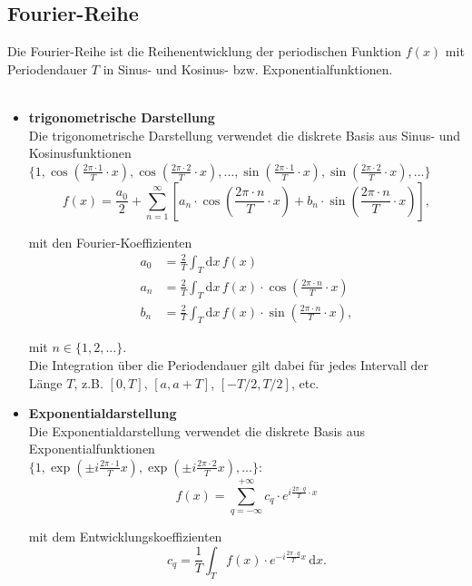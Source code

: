\documentclass{article}
\newcommand{\diff}{\mathrm{d}}
\newcommand{\lr}[1]{\left(#1\right)}
\newcommand{\lreck}[1]{\left[#1\right]}
\begin{document}
\subsection{Fourier-Reihe}
Die Fourier-Reihe ist die Reihenentwicklung der periodischen Funktion $f(x)$ mit Periodendauer $T$ in Sinus- und Kosinus- bzw. Exponentialfunktionen.\\
\\
	\begin{itemize}
		\item \textbf{trigonometrische Darstellung}\\
		Die trigonometrische Darstellung verwendet die diskrete Basis aus Sinus- und Kosinusfunktionen
		$\{1, \cos \lr{ \frac{2\pi \cdot 1}{T} \cdot x }, \cos \lr{ \frac{2\pi \cdot 2}{T} \cdot x}, ..., \sin \lr{ \frac{2\pi \cdot 1}{T} \cdot x }, \sin \lr{ \frac{2\pi \cdot 2}{T} \cdot x }, ... \}$
			\begin{equation}
				f(x) = \frac{a_0}{2} + \sum_{n=1}^\infty \lreck{ a_n \cdot \cos \lr{ \frac{2\pi \cdot n}{T} \cdot x } + b_n \cdot \sin \lr{ \frac{2\pi \cdot n}{T} \cdot x } },
			\end{equation}

		mit den Fourier-Koeffizienten
			\begin{align}
				a_0 &= \frac{2}{T} \int_T \diff x \, f(x) \\
				a_n &= \frac{2}{T} \int_T \diff x \, f(x) \cdot \cos \lr{ \frac{2\pi \cdot n}{T} \cdot x } \\
				b_n &= \frac{2}{T} \int_T \diff x \, f(x) \cdot \sin \lr{ \frac{2\pi \cdot n}{T} \cdot x },
			\end{align}

		mit $n \in \{1, 2, ... \}$.\\
		Die Integration über die Periodendauer gilt dabei für jedes Intervall der Länge $T$, z.B. $[0,T]$, $[a,a+T]$, $[-T/2,T/2]$, etc.
		
		
		\item \textbf{Exponentialdarstellung}\\
		Die Exponentialdarstellung verwendet die diskrete Basis aus Exponentialfunktionen\\
		$\{1, \exp\lr{ \pm i \frac{2\pi \cdot 1}{T}x }, \exp\lr{ \pm i \frac{2\pi \cdot 2}{T}x }, ... \}$:
			\begin{equation}
				f(x) = \sum_{q=-\infty}^{+\infty} c_q \cdot e^{i\frac{2\pi \cdot q}{T} \cdot x}
			\end{equation}

		mit dem Entwicklungskoeffizienten
			\begin{equation}
				c_q = \frac{1}{T} \int_T f(x) \cdot e^{-i \frac{2\pi \cdot q}{T} x} \, \diff x.
			\end{equation}
	\end{itemize}
\end{document}
